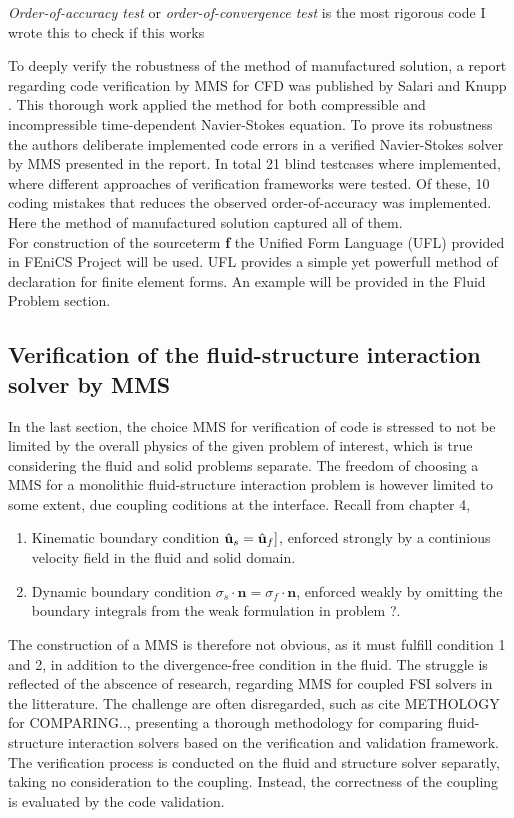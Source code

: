 \textit{Order-of-accuracy test} or \textit{order-of-convergence test} is the most rigorous code 
I wrote this to check if this works

To deeply verify the robustness of the method of manufactured solution,  a report regarding code verification by MMS for CFD was published by Salari and Knupp \cite{Biggs}. This thorough work applied the method for both compressible and incompressible time-dependent Navier-Stokes equation. To prove its robustness the authors deliberate implemented  code errors in a verified Navier-Stokes solver by MMS presented in the report. In total 21 blind testcases where implemented, where different approaches of verification frameworks were tested. 
Of these, 10 coding mistakes that reduces the observed order-of-accuracy was implemented. Here the method of manufactured solution captured all of them. \\


For construction of the sourceterm \textbf{f} the Unified Form Language (UFL) \cite{Project2016} provided in FEniCS Project will be used. UFL provides a simple yet powerfull method of declaration for finite element forms. An example will be provided in the Fluid Problem section. 

\subsection{Verification of the fluid-structure interaction solver by MMS}
In the last section, the choice MMS for verification of code is stressed to not be limited by the overall physics of the given problem of interest, which is true considering the fluid and solid problems separate.
The freedom of choosing a MMS for a  monolithic fluid-structure interaction problem is however limited to some extent, due coupling coditions at the interface. Recall from chapter 4, 
\begin{enumerate}
\item Kinematic boundary condition $\hat{\mathbf{u}}_s = \hat{\mathbf{u}}_f]$, enforced strongly by a continious velocity field in the fluid
        and solid domain.
\item Dynamic boundary condition $\sigma_s \cdot \mathbf{n}= \sigma_f \cdot \mathbf{n}$, enforced weakly by omitting the 
        boundary integrals from the weak formulation in problem ?.
\end{enumerate}
The construction of a MMS is therefore not obvious, as it must fulfill condition 1 and 2, in addition to the divergence-free condition in the fluid. The struggle is reflected of the abscence of research, regarding MMS for coupled FSI solvers in the litterature. The challenge are often disregarded, such as cite METHOLOGY for COMPARING.., presenting a thorough methodology for comparing fluid-structure interaction solvers based on the verification and validation framework. The verification process is conducted on the fluid and structure solver separatly, taking no consideration to the coupling. Instead, the correctness of the coupling is evaluated by the code validation.  



